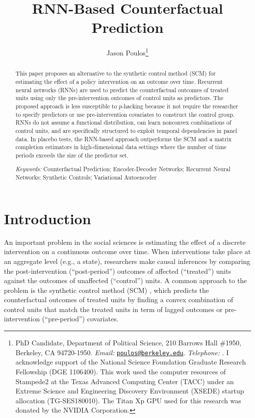 \documentclass[hidelinks,12pt]{article}
\title{RNN-Based Counterfactual Prediction}
\author[ ]{Jason Poulos\thanks{PhD Candidate, Department of Political Science, 210 Barrows Hall \#1950, Berkeley, CA 94720-1950. \emph{Email:} \href{mailto:poulos@berkeley.edu}{\nolinkurl{poulos@berkeley.edu}}. \emph{Telephone:} \Plus 1\Minus 510\Minus 642\Minus 6323. I acknowledge support of the National Science Foundation Graduate Research Fellowship (DGE 1106400). This work used the computer resources of Stampede2 at the Texas Advanced Computing Center (TACC) under an Extreme Science and Engineering Discovery Environment (XSEDE) startup allocation (TG-SES180010). The Titan Xp GPU used for this research was donated by the NVIDIA Corporation.}}
\affil[ ]{University of California, Berkeley}
\date{}
\begin{document}
 
 
\begin{singlespacing}
\maketitle  
\end{singlespacing}
\thispagestyle{empty}

\begin{abstract}  %
\noindent 
This paper proposes an alternative to the synthetic control method (SCM) for estimating the effect of a policy intervention on an outcome over time. Recurrent neural networks (RNNs) are used to predict the counterfactual outcomes of treated units using only the pre-intervention outcomes of control units as predictors. The proposed approach is less susceptible to $p$-hacking because it not require the researcher to specify predictors or use pre-intervention covariates to construct the control group. RNNs do not assume a functional distribution, can learn nonconvex combinations of control units, and are specifically structured to exploit temporal dependencies in panel data. In placebo tests, the RNN-based approach outperforms the SCM and a matrix completion estimators in high-dimensional data settings where the number of time periods exceeds the size of the predictor set. 
\\
\begin{singlespace}
	\emph{Keywords:} Counterfactual Prediction; Encoder-Decoder Networks; Recurrent Neural Networks; Synthetic Controls; Variational Autoencoder
\end{singlespace}
\end{abstract}

\pagebreak
{}%

\section{Introduction} 

An important problem in the social sciences is estimating the effect of a discrete intervention on a continuous outcome over time. When interventions take place at an aggregate level (e.g., a state), researchers make causal inferences by comparing the post-intervention (``post-period'') outcomes of affected (``treated'') units against the outcomes of unaffected  (``control'') units. A common approach to the problem is the synthetic control method (SCM) \citep{abadie2010synthetic}, which predicts the counterfactual outcomes of treated units by finding a convex combination of control units that match the treated units in term of lagged outcomes or pre-intervention (``pre-period'') covariates. 
\end{document}

